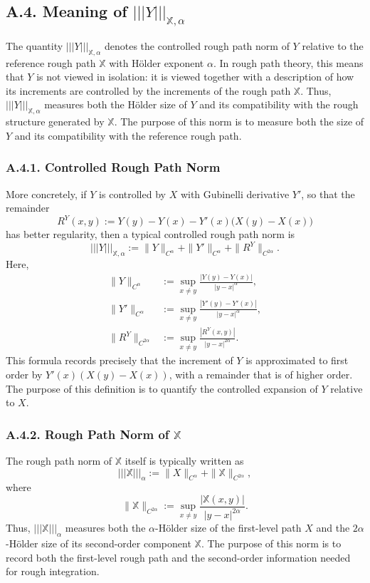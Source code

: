 \documentclass[11pt]{article}
\theoremstyle{definition}
\theoremstyle{remark}
\begin{document}
\subsection*{A.4. Meaning of $|||Y|||_{\mathbb X,\alpha}$}
The quantity $|||Y|||_{\mathbb X,\alpha}$ denotes the controlled rough path norm of $Y$ relative to the reference rough path $\mathbb X$ with H\"older exponent $\alpha$. In rough path theory, this means that $Y$ is not viewed in isolation: it is viewed together with a description of how its increments are controlled by the increments of the rough path $\mathbb X$. Thus, $|||Y|||_{\mathbb X,\alpha}$ measures both the H\"older size of $Y$ and its compatibility with the rough structure generated by $\mathbb X$.
The purpose of this norm is to measure both the size of $Y$ and its compatibility with the reference rough path.

\subsubsection*{A.4.1. Controlled Rough Path Norm}
More concretely, if $Y$ is controlled by $X$ with Gubinelli derivative $Y'$, so that the remainder
\[
R^Y(x,y):=Y(y)-Y(x)-Y'(x)\bigl(X(y)-X(x)\bigr)
\]
has better regularity, then a typical controlled rough path norm is
\[
|||Y|||_{\mathbb X,\alpha}
:=
\|Y\|_{C^\alpha}
+
\|Y'\|_{C^\alpha}
+
\|R^Y\|_{C^{2\alpha}}.
\]
Here,
\[
\begin{aligned}
\|Y\|_{C^\alpha}
&:=
\sup_{x\neq y}\frac{|Y(y)-Y(x)|}{|y-x|^\alpha},\\
\|Y'\|_{C^\alpha}
&:=
\sup_{x\neq y}\frac{|Y'(y)-Y'(x)|}{|y-x|^\alpha},\\
\|R^Y\|_{C^{2\alpha}}
&:=
\sup_{x\neq y}\frac{|R^Y(x,y)|}{|y-x|^{2\alpha}}.
\end{aligned}
\]
This formula records precisely that the increment of $Y$ is approximated to first order by $Y'(x)(X(y)-X(x))$, with a remainder that is of higher order.
The purpose of this definition is to quantify the controlled expansion of $Y$ relative to $X$.

\subsubsection*{A.4.2. Rough Path Norm of $\mathbb X$}
The rough path norm of $\mathbb X$ itself is typically written as
\[
|||\mathbb X|||_{\alpha}
:=
\|X\|_{C^\alpha}
+
\|\mathbb X\|_{C^{2\alpha}},
\]
where
\[
\|\mathbb X\|_{C^{2\alpha}}
:=
\sup_{x\neq y}\frac{|\mathbb X(x,y)|}{|y-x|^{2\alpha}}.
\]
Thus, $|||\mathbb X|||_{\alpha}$ measures both the $\alpha$-H\"older size of the first-level path $X$ and the $2\alpha$-H\"older size of its second-order component $\mathbb X$.
The purpose of this norm is to record both the first-level rough path and the second-order information needed for rough integration.
\end{document}
